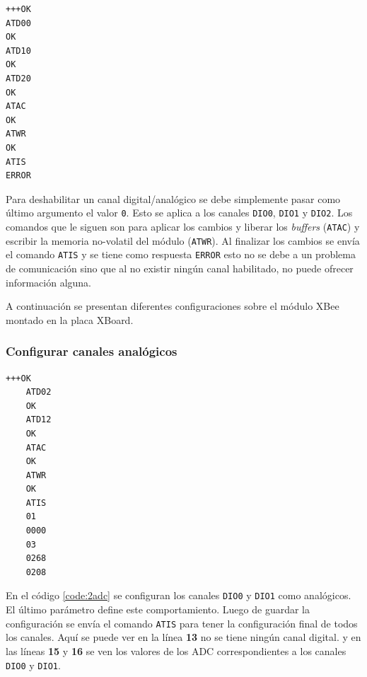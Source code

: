 \documentclass[11pt,oneside,spanish,a4paper]{article}
\begin{document}
\noindent\begin{minipage}{.25\textwidth}
\begin{lstlisting}[emph={+++,ATIS,ATD00,ATD10,ATD20,ATWR,ATAC}, emphstyle={\color{blue}}]
+++OK
ATD00
OK
ATD10
OK
ATD20
OK
ATAC
OK
ATWR
OK
ATIS
ERROR
\end{lstlisting}
\end{minipage} \hfill
\begin{minipage}{.70\textwidth}
Para deshabilitar un canal digital/analógico se debe simplemente pasar
como último argumento el valor \texttt{0}. Esto se aplica a los
canales \texttt{DIO0}, \texttt{DIO1} y \texttt{DIO2}. Los comandos que
le siguen son para aplicar los cambios y liberar los \textsl{buffers}
(\texttt{ATAC}) y  escribir la
memoria no-volatil del módulo (\texttt{ATWR}). Al finalizar los
cambios se envía el comando \texttt{ATIS} y se tiene como respuesta
\texttt{ERROR} esto no se debe a un problema de comunicación sino que
al no existir ningún canal habilitado, no puede ofrecer información
alguna. 
\end{minipage}

A continuación se presentan diferentes configuraciones sobre el módulo
XBee montado en la placa XBoard.

\subsubsection{Configurar canales analógicos}

\noindent\begin{minipage}{.35\textwidth}
\begin{lstlisting}[emph={+++,ATIS,ATD02,ATD12,ATWR,ATAC},
    emphstyle={\color{blue}},caption={Canales analógicos.},label=code:2adc]
    +++OK
    ATD02
    OK
    ATD12
    OK
    ATAC
    OK
    ATWR
    OK
    ATIS
    01
    0000
    03
    0268
    0208
\end{lstlisting}  
\end{minipage}\hfill
\begin{minipage}{.60\textwidth}
En el código \ref{code:2adc} se configuran los canales \texttt{DIO0}
y \texttt{DIO1} como analógicos. El último parámetro define este
comportamiento. Luego de guardar la configuración se envía el comando
\texttt{ATIS} para tener la configuración final de todos los
canales. Aquí se puede ver en la línea \textbf{13} no se tiene ningún
canal digital. y en las líneas \textbf{15} y \textbf{16} se ven los
valores de los ADC correspondientes a los canales \texttt{DIO0} y
\texttt{DIO1}.
\end{minipage}
\end{document}
